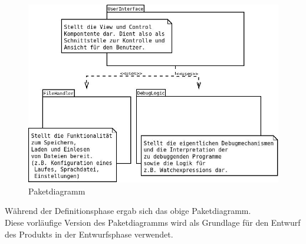 \documentclass[parskip=full]{scrartcl}
\begin{document}
\newpage

\begin{figure}[!ht]
	\centering
	\includegraphics[width=1.0\textwidth]{pakete}
	\caption{Paketdiagramm}
	\label{fig:Bild3} 

\end{figure}
\vspace{0.7cm}
	Während der Definitionsphase ergab sich das obige Paketdiagramm.\\ 
	Diese vorläufige Version des Paketdiagramms wird als Grundlage für den Entwurf des
	Produkts in der Entwurfsphase verwendet.
	
\newpage
\end{document}
